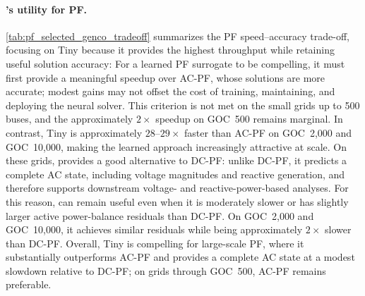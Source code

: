 \paragraph{\genco's utility for PF.} \cref{tab:pf_selected_genco_tradeoff} summarizes the PF speed--accuracy trade-off, focusing on \genco Tiny because it provides the highest throughput while retaining useful solution accuracy: For a learned PF surrogate to be compelling, it must first provide a meaningful speedup over AC-PF, whose solutions are more accurate; modest gains may not offset the cost of training, maintaining, and deploying the neural solver. This criterion is not met on the small grids up to 500 buses, and the approximately $2\times$ speedup on GOC~500 remains marginal. In contrast, \genco Tiny is approximately $28$--$29\times$ faster than AC-PF on GOC~2,000 and GOC~10,000, making the learned approach increasingly attractive at scale. On these grids, \genco provides a good alternative to DC-PF: unlike DC-PF, it predicts a complete AC state, including voltage magnitudes and reactive generation, and therefore supports downstream voltage- and reactive-power-based analyses. For this reason, \genco can remain useful even when it is moderately slower or has slightly larger active power-balance residuals than DC-PF. On GOC~2,000 and GOC~10,000, it achieves similar residuals while being approximately $2\times$ slower than DC-PF. Overall, \genco Tiny is compelling for large-scale PF, where it substantially outperforms AC-PF and provides a complete AC state at a modest slowdown relative to DC-PF; on grids through GOC~500, AC-PF remains preferable.

